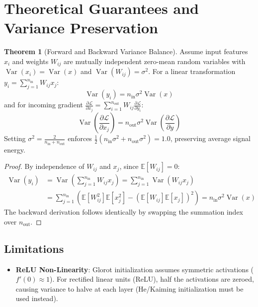 \documentclass[11pt,a4paper]{article}
\theoremstyle{definition}
\newtheorem{theorem}{Theorem}[section]
\begin{document}
\section{Theoretical Guarantees and Variance Preservation}

\begin{theorem}[Forward and Backward Variance Balance]
Assume input features $x_i$ and weights $W_{ij}$ are mutually independent zero-mean random variables with $\operatorname{Var}(x_i) = \operatorname{Var}(x)$ and $\operatorname{Var}(W_{ij}) = \sigma^2$. For a linear transformation $y_i = \sum_{j=1}^{n_{\text{in}}} W_{ij} x_j$:
\begin{equation}
\operatorname{Var}(y_i) = n_{\text{in}} \sigma^2 \operatorname{Var}(x)
\end{equation}
and for incoming gradient $\frac{\partial \mathcal{L}}{\partial x_j} = \sum_{i=1}^{n_{\text{out}}} W_{ij} \frac{\partial \mathcal{L}}{\partial y_i}$:
\begin{equation}
\operatorname{Var}\left(\frac{\partial \mathcal{L}}{\partial x_j}\right) = n_{\text{out}} \sigma^2 \operatorname{Var}\left(\frac{\partial \mathcal{L}}{\partial y}\right)
\end{equation}
Setting $\sigma^2 = \frac{2}{n_{\text{in}} + n_{\text{out}}}$ enforces $\frac{1}{2}\left(n_{\text{in}} \sigma^2 + n_{\text{out}} \sigma^2\right) = 1.0$, preserving average signal energy.
\end{theorem}

\begin{proof}
By independence of $W_{ij}$ and $x_j$, since $\mathbb{E}[W_{ij}] = 0$:
\begin{align}
\operatorname{Var}(y_i) &= \operatorname{Var}\left(\sum_{j=1}^{n_{\text{in}}} W_{ij} x_j\right) = \sum_{j=1}^{n_{\text{in}}} \operatorname{Var}(W_{ij} x_j) \\
&= \sum_{j=1}^{n_{\text{in}}} \left( \mathbb{E}[W_{ij}^2] \mathbb{E}[x_j^2] - (\mathbb{E}[W_{ij}]\mathbb{E}[x_j])^2 \right) = n_{\text{in}} \sigma^2 \operatorname{Var}(x)
\end{align}
The backward derivation follows identically by swapping the summation index over $n_{\text{out}}$.
\end{proof}

\subsection{Limitations}
\begin{itemize}
    \item \textbf{ReLU Non-Linearity}: Glorot initialization assumes symmetric activations ($f'(0) \approx 1$). For rectified linear units (ReLU), half the activations are zeroed, causing variance to halve at each layer (He/Kaiming initialization must be used instead).
\end{itemize}
\end{document}
